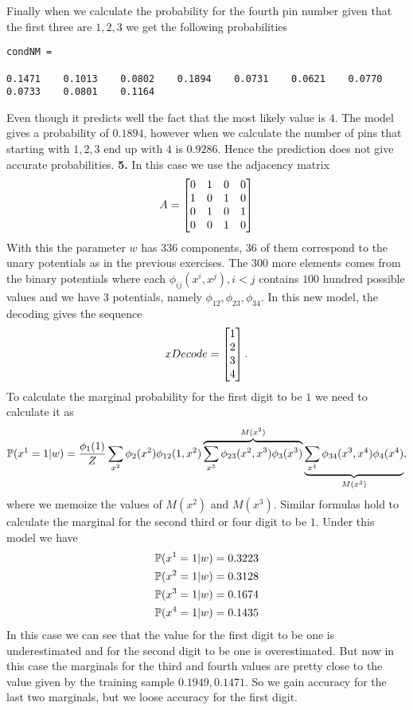 \documentclass{article}
\begin{document}
Finally when we calculate the probability for the fourth pin number given that the first three are $1,2,3$ we get the following 
probabilities
\begin{verbatim}
condNM =

0.1471    0.1013    0.0802    0.1894    0.0731    0.0621    0.0770    0.0733    0.0801    0.1164
\end{verbatim}
Even though it predicts well the fact that the most likely value is $4$. The model gives a probability of $0.1894$, however
when we calculate the number of pins that starting with $1,2,3$ end up with $4$ is $0.9286$. Hence the prediction
does not give accurate probabilities.
\newline
\newline
\textbf{5.}
\newline
In this case we use the adjacency matrix
\begin{equation*}
A=\begin{bmatrix}
0 & 1 & 0 & 0\\
1 & 0 & 1 & 0\\
0 & 1 & 0 & 1\\
0 & 0 & 1 & 0
\end{bmatrix}
\end{equation*}
With this the parameter $w$ has 336 components, 36 of them correspond to the unary potentials as in the previous exercises. The $300$ more elements comes from
the binary potentials where each $\phi_{ij}(x^{i},x^{j}), i<j$ contains $100$ hundred possible values and we have 3 potentials, namely $\phi_{12},\phi_{23},\phi_{34}$.
In this new model, the decoding gives the sequence
\begin{equation*}
xDecode=\begin{bmatrix}1\\2\\3\\4\end{bmatrix}.
\end{equation*}
To calculate the marginal probability for the first digit to be $1$ we  need to calculate it as
\begin{equation*}
\mathbb{P}(x^{1}=1|w)=\frac{\phi_{1}(1)}{Z}\sum_{x^{2}}\phi_{2}(x^{2})\phi_{12}(1,x^{2})\overbrace{\sum_{x^{3}}\phi_{23}(x^{2},x^{3})\phi_{3}(x^{3})}^{M(x^{2})}
\underbrace{\sum_{x^{4}}\phi_{34}(x^{3},x^{4})\phi_{4}(x^{4})}_{M(x^{3})},
\end{equation*}
where we memoize the values of $M(x^{2})$ and $M(x^{3})$. Similar formulas hold to calculate the marginal for the second third or four digit to be $1$. 
Under this model we have
\begin{align*}
\mathbb{P}(x^{1}=1|w)=0.3223\\
\mathbb{P}(x^{2}=1|w)=0.3128 \\
\mathbb{P}(x^{3}=1|w)= 0.1674\\
\mathbb{P}(x^{4}=1|w)=0.1435 \\
\end{align*}
In this case we can see that the value for the first digit to be one  is underestimated and for the second digit to be one is overestimated. But now
in this case the marginals for the third and fourth values are pretty close to the value given by the training sample $0.1949,0.1471$. So we gain
accuracy for the last two marginals, but we loose accuracy for the first digit. 
\end{document}
